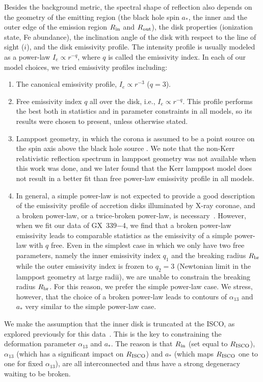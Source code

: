 \documentclass[11pt,a4paper,pdftex]{article}
\begin{document}
Besides the background metric, the spectral shape of reflection also depends on the geometry of the emitting region (the black hole spin $a_*$, the inner and the outer edge of the emission region $R_{\rm in}$ and $R_{\rm out}$), the disk properties (ionization state, Fe abundance), the inclination angle of the disk with respect to the line of sight ($i$), and the disk emissivity profile. The intensity profile is usually modeled as a power-law $I_e\propto r^{-q}$, where $q$ is called the emissivity index. In each of our model choices, we tried emissivity profiles including:
\begin{enumerate}[nosep]
  \item The canonical emissivity profile, $I_e\propto r^{-3}$ ($q=3$).
  \item Free emissivity index $q$ all over the disk, i.e., $I_e\propto r^{-q}$. This profile performs the best both in statistics and in parameter constraints in all models, so its results were chosen to present, unless otherwise stated. 
  \item Lamppost geometry, in which the corona is assumed to be a point source on the spin axis above the black hole source \cite{lamppost}. We note that the non-Kerr relativistic reflection spectrum in lamppost geometry was not available when this work was done, and we later found that the Kerr lamppost model does not result in a better fit than free power-law emissivity profile in all models. 
    \item In general, a simple power-law is not expected to provide a good description of the emissivity profile of accretion disks illuminated by X-ray coronae, and a broken power-law, or a twice-broken power-law, is necessary~\cite{Miniutti:2003yd,Wilkins:2011kt,Wilkins:2012zm}. However, when we fit our data of GX~339$-$4, we find that a broken power-law emissivity leads to comparable statistics as the emissivity of a simple power-law with $q$ free. Even in the simplest case in which we only have two free parameters, namely the inner emissivity index $q_1$ and the breaking radius $R_{\rm br}$ while the outer emissivity index is frozen to $q_2=3$ (Newtonian limit in the lamppost geometry at large radii), we are unable to constrain the breaking radius $R_{\rm br}$. For this reason, we prefer the simple power-law case. We stress, however, that the choice of a broken power-law leads to contours of $\alpha_{13}$ and $a_*$ very similar to the simple power-law case.
\end{enumerate}


We make the assumption that the inner disk is truncated at the ISCO, as explored previously for this data~\cite{javier_gx339}. This is the key to constraining the deformation parameter $\alpha_{13}$ and $a_*$. The reason is that $R_{\rm in}$ (set equal to $R_{\rm ISCO}$), $\alpha_{13}$ (which has a significant impact on $R_{\rm ISCO}$) and $a_*$ (which maps $R_{\rm ISCO}$ one to one for fixed $\alpha_{13}$), are all interconnected and thus have a strong degeneracy waiting to be broken. 
\end{document}
